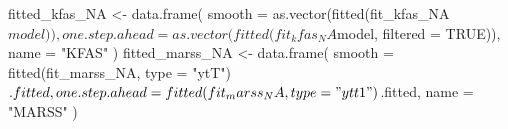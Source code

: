\begin{Schunk}
\begin{Sinput}
 fitted_kfas_NA <- data.frame(
   smooth = as.vector(fitted(fit_kfas_NA$model)),
   one.step.ahead = as.vector(fitted(fit_kfas_NA$model, filtered = TRUE)),
   name = "KFAS"
 )
 fitted_marss_NA <- data.frame(
   smooth = fitted(fit_marss_NA, type = "ytT")$.fitted,
   one.step.ahead = fitted(fit_marss_NA, type = "ytt1")$.fitted,
   name = "MARSS"
 )
\end{Sinput}
\end{Schunk}
